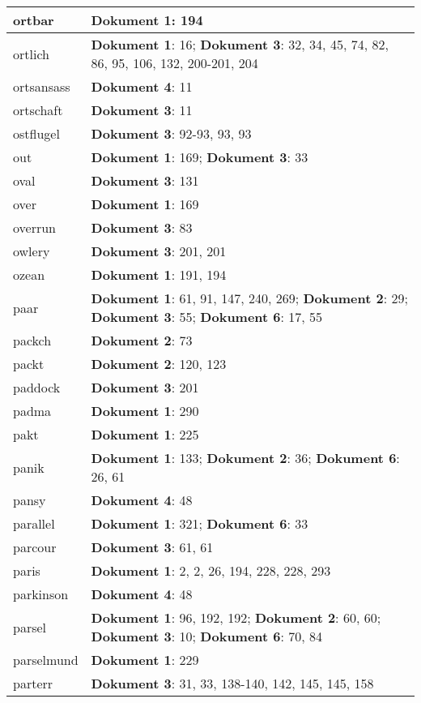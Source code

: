 \documentclass[a5paper]{article}
\begin{document}
\begin{longtable}[l]{|l|p{3in}|}
\hline
ortbar & \textbf{Dokument 1}: 194 \\
\hline
ortlich & \textbf{Dokument 1}: 16; \textbf{Dokument 3}: 32, 34, 45, 74, 82, 86, 95, 106, 132, 200-201, 204 \\
\hline
ortsansass & \textbf{Dokument 4}: 11 \\
\hline
ortschaft & \textbf{Dokument 3}: 11 \\
\hline
ostflugel & \textbf{Dokument 3}: 92-93, 93, 93 \\
\hline
out & \textbf{Dokument 1}: 169; \textbf{Dokument 3}: 33 \\
\hline
oval & \textbf{Dokument 3}: 131 \\
\hline
over & \textbf{Dokument 1}: 169 \\
\hline
overrun & \textbf{Dokument 3}: 83 \\
\hline
owlery & \textbf{Dokument 3}: 201, 201 \\
\hline
ozean & \textbf{Dokument 1}: 191, 194 \\
\hline
paar & \textbf{Dokument 1}: 61, 91, 147, 240, 269; \textbf{Dokument 2}: 29; \textbf{Dokument 3}: 55; \textbf{Dokument 6}: 17, 55 \\
\hline
packch & \textbf{Dokument 2}: 73 \\
\hline
packt & \textbf{Dokument 2}: 120, 123 \\
\hline
paddock & \textbf{Dokument 3}: 201 \\
\hline
padma & \textbf{Dokument 1}: 290 \\
\hline
pakt & \textbf{Dokument 1}: 225 \\
\hline
panik & \textbf{Dokument 1}: 133; \textbf{Dokument 2}: 36; \textbf{Dokument 6}: 26, 61 \\
\hline
pansy & \textbf{Dokument 4}: 48 \\
\hline
parallel & \textbf{Dokument 1}: 321; \textbf{Dokument 6}: 33 \\
\hline
parcour & \textbf{Dokument 3}: 61, 61 \\
\hline
paris & \textbf{Dokument 1}: 2, 2, 26, 194, 228, 228, 293 \\
\hline
parkinson & \textbf{Dokument 4}: 48 \\
\hline
parsel & \textbf{Dokument 1}: 96, 192, 192; \textbf{Dokument 2}: 60, 60; \textbf{Dokument 3}: 10; \textbf{Dokument 6}: 70, 84 \\
\hline
parselmund & \textbf{Dokument 1}: 229 \\
\hline
parterr & \textbf{Dokument 3}: 31, 33, 138-140, 142, 145, 145, 158 \\

\end{longtable}
\end{document}
